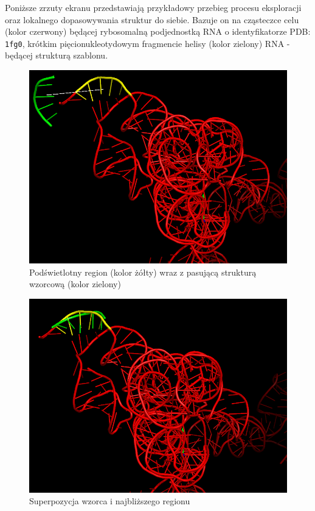 \documentclass[licencjacka]{pracamgr}
\begin{document}
Poniższe zrzuty ekranu przedstawiają przykładowy przebieg procesu eksploracji oraz lokalnego dopasowywania struktur do siebie. Bazuje on na cząsteczce celu (kolor czerwony) będącej rybosomalną podjednostką RNA o identyfikatorze PDB: \texttt{1fg0}, krótkim pięcionukleotydowym fragmencie helisy (kolor zielony) RNA - będącej strukturą szablonu. 

\begin{figure}[H]
\centering
\includegraphics[scale=0.45,center]{ex1}
\caption{Podświetlotny region (kolor żółty) wraz z pasującą strukturą wzorcową (kolor zielony)}
\end{figure}

\begin{figure}[H]
\centering
\includegraphics[scale=0.45,center]{ex1-aligned}
\caption{Superpozycja wzorca i najbliższego regionu}
\end{figure}
\end{document}
